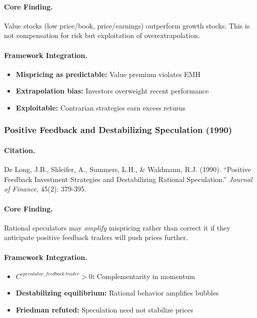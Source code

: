\documentclass[12pt,a4paper]{article}
\begin{document}
\paragraph{Core Finding.}
Value stocks (low price/book, price/earnings) outperform growth stocks.
This is not compensation for risk but exploitation of overextrapolation.

\paragraph{Framework Integration.}
\begin{itemize}
  \item \textbf{Mispricing as predictable:} Value premium violates EMH
  \item \textbf{Extrapolation bias:} Investors overweight recent performance
  \item \textbf{Exploitable:} Contrarian strategies earn excess returns
\end{itemize}

\subsubsection{Positive Feedback and Destabilizing Speculation (1990)}

\paragraph{Citation.}
De Long, J.B., Shleifer, A., Summers, L.H., \& Waldmann, R.J. (1990).
``Positive Feedback Investment Strategies and Destabilizing Rational Speculation.''
\emph{Journal of Finance}, 45(2): 379-395.

\paragraph{Core Finding.}
Rational speculators may \emph{amplify} mispricing rather than correct it
if they anticipate positive feedback traders will push prices further.

\paragraph{Framework Integration.}
\begin{itemize}
  \item \textbf{$C^{speculator,feedback\ trader} > 0$:} Complementarity in momentum
  \item \textbf{Destabilizing equilibrium:} Rational behavior amplifies bubbles
  \item \textbf{Friedman refuted:} Speculation need not stabilize prices
\end{itemize}
\end{document}
